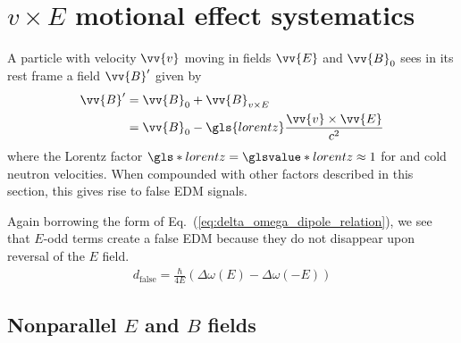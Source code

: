 
\section
{
    \texorpdfstring{$v\times E$ motional effect systematics}
                    {v x E motional effect systematics}\label{sec:v_cross_E}
}


A particle with velocity $\vv{v}$ moving in fields $\vv{E}$ and $\vv{B}_0$ sees in its rest frame a field $\vv{B}'$ given by
%
\begin{align}
    \vv{B}' &= \vv{B}_0+\vv{B}_{v\times E} \\
            &= \vv{B}_0-\gls{lorentz}\frac{\vv{v}\times\vv{E}}{c^2}
\end{align}
%
where the Lorentz factor $\gls*{lorentz}=\glsvalue*{lorentz}\approx 1$ for \ucn and cold neutron velocities. When compounded with other factors described in this section, this gives rise to false EDM signals.

Again borrowing the form of Eq.~(\ref{eq:delta_omega_dipole_relation}), we see that $E$-odd terms create a false EDM because they do not disappear upon reversal of the $E$ field.
%
\begin{gather}
    d_\text{false}=\frac{\hbar}{4E}(\Delta\omega(E)-\Delta\omega(-E))
\end{gather}

\subsection*{
    \texorpdfstring{Nonparallel $E$ and $B$ fields}
                    {Nonparallel E and B fields}
}

